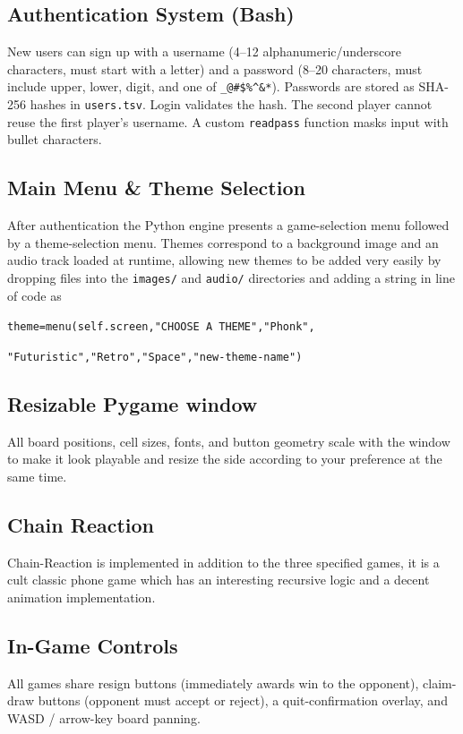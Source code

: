 \documentclass[12pt]{article}
\begin{document}
\subsection{Authentication System (Bash)}
New users can sign up with a username (4–12 alphanumeric/underscore characters, must start with a letter) and a password (8–20 characters, must include upper, lower, digit, and one of \texttt{\_@\#\$\%\^{}\&*}). Passwords are stored as SHA-256 hashes in \texttt{users.tsv}. Login validates the hash. The second player cannot reuse the first player's username. A custom \texttt{readpass} function masks input with bullet characters.

\subsection{Main Menu \& Theme Selection}
After authentication the Python engine presents a game-selection menu followed by a theme-selection menu. Themes correspond to a background image and an audio track loaded at runtime, allowing new themes to be added very easily by dropping files into the \texttt{images/} and \texttt{audio/} directories and adding a string in line of code as

\texttt{theme=menu(self.screen,"CHOOSE A THEME","Phonk",}

\texttt{"Futuristic","Retro","Space","new-theme-name")}

\subsection{Resizable Pygame window} All board positions, cell sizes, fonts, and button geometry scale with the window to make it look playable and resize the side according to your preference at the same time.

\subsection{Chain Reaction}
Chain-Reaction is implemented in addition to the three specified games, it is a cult classic phone game which has an interesting recursive logic and a decent animation implementation.

\subsection{In-Game Controls}
All games share resign buttons (immediately awards win to the opponent), claim-draw buttons (opponent must accept or reject), a quit-confirmation overlay, and WASD / arrow-key board panning.
\end{document}

